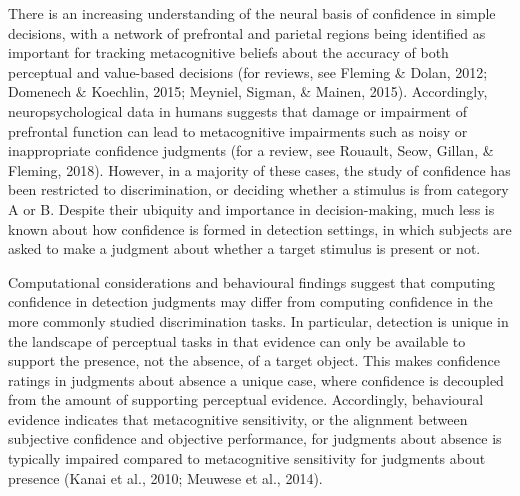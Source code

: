 \documentclass[12pt,twoside]{reedthesis}
\begin{document}
There is an increasing understanding of the neural basis of confidence in simple decisions, with a network of prefrontal and parietal regions being identified as important for tracking metacognitive beliefs about the accuracy of both perceptual and value-based decisions (for reviews, see Fleming \& Dolan, 2012; Domenech \& Koechlin, 2015; Meyniel, Sigman, \& Mainen, 2015). Accordingly, neuropsychological data in humans suggests that damage or impairment of prefrontal function can lead to metacognitive impairments such as noisy or inappropriate confidence judgments (for a review, see Rouault, Seow, Gillan, \& Fleming, 2018). However, in a majority of these cases, the study of confidence has been restricted to discrimination, or deciding whether a stimulus is from category A or B. Despite their ubiquity and importance in decision-making, much less is known about how confidence is formed in detection settings, in which subjects are asked to make a judgment about whether a target stimulus is present or not.

Computational considerations and behavioural findings suggest that computing confidence in detection judgments may differ from computing confidence in the more commonly studied discrimination tasks. In particular, detection is unique in the landscape of perceptual tasks in that evidence can only be available to support the presence, not the absence, of a target object. This makes confidence ratings in judgments about absence a unique case, where confidence is decoupled from the amount of supporting perceptual evidence. Accordingly, behavioural evidence indicates that metacognitive sensitivity, or the alignment between subjective confidence and objective performance, for judgments about absence is typically impaired compared to metacognitive sensitivity for judgments about presence (Kanai et al., 2010; Meuwese et al., 2014).
\end{document}
